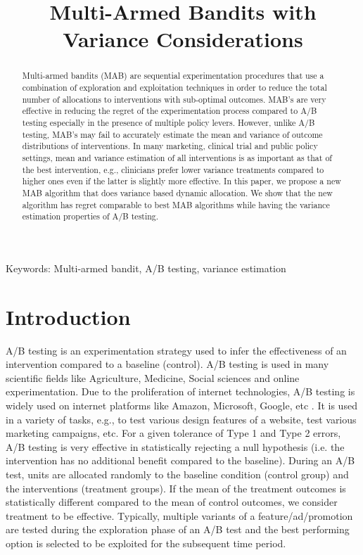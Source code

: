 \documentclass[12pt, letterpaper]{article}
\title{Multi-Armed Bandits with Variance Considerations}
\date{}
\author{}
\begin{document}
\maketitle

\begin{abstract}
Multi-armed bandits (MAB) are sequential experimentation procedures that use a combination of exploration and exploitation techniques in order to reduce the total number of allocations to interventions with sub-optimal outcomes. MAB's are very effective in reducing the regret of the experimentation process compared to A/B testing especially in the presence of multiple policy levers. However, unlike A/B testing, MAB's may fail to accurately estimate the mean and variance of outcome distributions of interventions. In many marketing, clinical trial and public policy settings, mean and variance estimation of all interventions is as important as that of the best intervention, e.g., clinicians prefer lower variance treatments compared to higher ones even if the latter is slightly more effective. In this paper, we propose a new MAB algorithm that does variance based dynamic allocation. We show that the new algorithm has regret comparable to best MAB algorithms while having the variance estimation properties of A/B testing. 
\end{abstract}

{Keywords: Multi-armed bandit, A/B testing, variance estimation}

\section*{Introduction}
A/B testing is an experimentation strategy used to infer the effectiveness of an intervention compared to a baseline (control). A/B testing is used in many scientific fields like Agriculture, Medicine, Social sciences and online experimentation. Due to the proliferation of internet technologies, A/B testing is widely used on internet platforms like Amazon, Microsoft, Google, etc \citep{kohavi2009controlled}. It is used in a variety of tasks, e.g., to test various design features of a website, test various marketing campaigns, etc. For a given tolerance of Type 1 and Type 2 errors, A/B testing is very effective in statistically rejecting a null hypothesis (i.e. the intervention has no additional benefit compared to the baseline). During an A/B test, units are allocated randomly to the baseline condition (control group) and the interventions (treatment groups). If the mean of the treatment outcomes is statistically different compared to the mean of control outcomes, we consider treatment to be effective.  Typically, multiple variants of a feature/ad/promotion are tested during the exploration phase of an A/B test and the best performing option is selected to be exploited for the subsequent time period.
\end{document}
